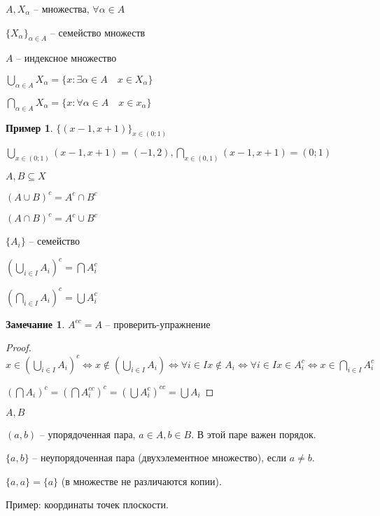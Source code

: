 \documentclass{book}
\theoremstyle{definition}
\newtheorem*{note}{Замечание}
\newtheorem*{example}{Пример}
\begin{document}
    \begin{definition}
        $A,X_{\alpha}$ -- множества, $\forall \alpha \in A$

        $\{X_{\alpha}\}_{\alpha\in A}$ -- семейство множеств

        $A$ -- индексное множество

        $\bigcup\limits_{\alpha\in A}X_{\alpha} = \{x:\exists \alpha\in A\quad x\in X_{\alpha}\} $

        $\bigcap\limits_{\alpha\in A}X_{\alpha} = \{x: \forall \alpha\in A\quad x\in x_{\alpha}\} $
    \end{definition}

    \begin{example}
        $\{(x-1,x+1)\}_{x\in (0;1)}$

        $\bigcup\limits_{x\in (0;1)}(x-1, x+1) = (-1,2) , \bigcap\limits_{x\in (0,1)} (x-1,x+1) = (0;1) $
        \end{example}

    \begin{definition}

        $A,B\subseteq X$

        $(A\cup B)^c = A^c\cap B^c$

        $(A\cap B)^c = A^c\cup B^c$
                

        $\{A_i\}$ -- семейство

        $(\bigcup\limits_{i\in I}A_i)^c  = \bigcap A_i^c$

        $\left( \bigcap\limits_{i \in  I} A_i \right) ^c = \bigcup A_i^c $
    \end{definition}
    \begin{note}
        $A^{c c} = A$ -- проверить-упражнение
    \end{note}

    \begin{proof}
        $x\in \left( \bigcup\limits_{i \in  I} A_i \right) ^c \iff  x\not\in \left( \bigcup\limits_{i \in  I} A_i \right) \iff \forall i\in I x\not\in A_i \iff  \forall i\in I x\in A_i^c \iff x\in \bigcap\limits_{i \in  I} A_i^c$

        $\left( \bigcap A_i \right) ^c = \left( \bigcap A_i^{c c} \right) ^c = \left( \bigcup A_i^c \right) ^{c c} = \bigcup A_i$
        \end{proof}

    \begin{definition}
        $A,B$

        $(a,b)$ -- упорядоченная пара, $a\in A, b\in B$. 
	    В этой паре важен порядок.

        $\{a,b\}$ -- неупорядоченная пара (двухэлементное множество), если $a\neq b$.

        $\{a,a\} = \{a\}$ (в множестве не различаются копии).
            
        Пример: координаты точек плоскости. 
    \end{definition}
\end{document}

